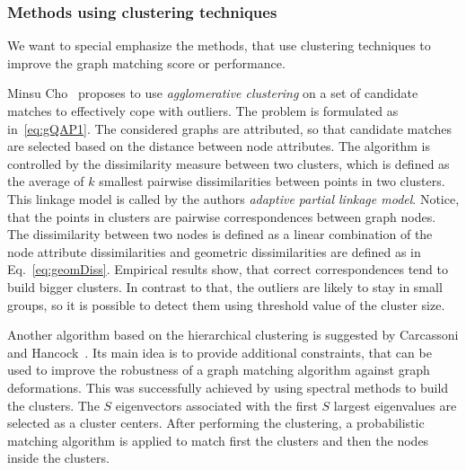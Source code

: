 \subsubsection{Methods using clustering techniques}
We want to special emphasize the methods, that use clustering techniques to improve the graph matching score or performance.

Minsu Cho~\cite{Cho2009_AgglClustering} proposes to use \emph{agglomerative clustering} on a set of candidate matches to effectively cope with outliers. The problem is formulated as in~\eqref{eq:gQAP1}. The considered graphs are attributed, so that candidate matches are selected based on the distance between node attributes. The algorithm is controlled by the dissimilarity measure between two clusters, which is defined as the average of $k$ smallest pairwise dissimilarities between points in two clusters. This linkage model is called by the authors \emph{adaptive partial linkage model}. Notice, that the points in clusters are pairwise correspondences between graph nodes. The dissimilarity between two nodes is defined as a linear combination of the node attribute dissimilarities and 
geometric dissimilarities are defined as in Eq.~\eqref{eq:geomDiss}. Empirical results show, that correct correspondences tend to build bigger clusters. In contrast to that, the outliers are likely to stay in small groups, so it is possible to detect them using threshold value of the cluster size.

Another algorithm based on the hierarchical clustering is suggested by Carcassoni and Hancock~\cite{Hancock_ModalClusters}. Its main idea is to provide additional constraints, that can be used to improve the robustness of a graph matching algorithm against graph deformations. This was successfully achieved by using spectral methods to build the clusters. The $S$ eigenvectors associated with the first $S$ largest eigenvalues are selected as a cluster centers. After performing the clustering, a probabilistic matching algorithm is applied to match first the clusters and then the nodes inside the clusters.

